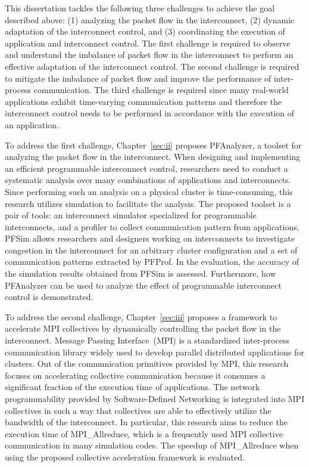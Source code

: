 This dissertation tackles the following three challenges to achieve the goal
described above: (1) analyzing the packet flow in the interconnect, (2)
dynamic adaptation of the interconnect control, and (3) coordinating the
execution of application and interconnect control. The first challenge is
required to observe and understand the imbalance of packet flow in the
interconnect to perform an effective adaptation of the interconnect control.
The second challenge is required to mitigate the imbalance of packet flow and
improve the performance of inter-process communication. The third challenge is
required since many real-world applications exhibit time-varying communication
patterns and therefore the interconnect control needs to be performed in
accordance with the execution of an application.

To address the first challenge, Chapter~\ref{sec:ii} proposes PFAnalyzer, a
toolset for analyzing the packet flow in the interconnect. When designing and
implementing an efficient programmable interconnect control, researchers need
to conduct a systematic analysis over many combinations of applications and
interconnects. Since performing such an analysis on a physical cluster is
time-consuming, this research utilizes simulation to facilitate the analysis.
The proposed toolset is a pair of tools: an interconnect simulator
specialized for programmable interconnects, and a profiler to collect
communication pattern from applications. PFSim allows researchers and
designers working on interconnects to investigate congestion in the
interconnect for an arbitrary cluster configuration and a set of communication
patterns extracted by PFProf. In the evaluation, the accuracy of the
simulation results obtained from PFSim is assessed. Furthermore, how
PFAnalyzer can be used to analyze the effect of programmable interconnect
control is demonstrated.

To address the second challenge, Chapter~\ref{sec:iii} proposes a framework to
accelerate MPI collectives by dynamically controlling the packet flow in the
interconnect. Message Passing Interface~(MPI) is a standardized inter-process
communication library widely used to develop parallel distributed
applications for clusters. Out of the communication primitives provided by
MPI, this research focuses on accelerating collective communication because it
consumes a significant fraction of the execution time of applications. The
network programmability provided by Software-Defined Networking is integrated
into MPI collectives in such a way that collectives are able to effectively
utilize the bandwidth of the interconnect. In particular, this research aims
to reduce the execution time of MPI\_Allreduce, which is a frequently used MPI
collective communication in many simulation codes. The speedup of
MPI\_Allreduce when using the proposed collective acceleration framework is
evaluated.

